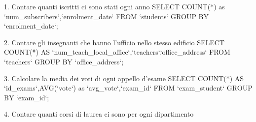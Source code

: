 1. Contare quanti iscritti ci sono stati ogni anno
SELECT COUNT(*) as `num_subscribers`,`enrolment_date` FROM `students` GROUP BY `enrolment_date`;

2. Contare gli insegnanti che hanno l'ufficio nello stesso edificio
SELECT COUNT(*) AS `num_teach_local_office`,`teachers`.`office_address` FROM `teachers` GROUP BY `office_address`;

3. Calcolare la media dei voti di ogni appello d'esame
SELECT COUNT(*) AS `id_exams`,AVG(`vote`) as `avg_vote`,`exam_id` FROM `exam_student` GROUP BY `exam_id`;


4. Contare quanti corsi di laurea ci sono per ogni dipartimento